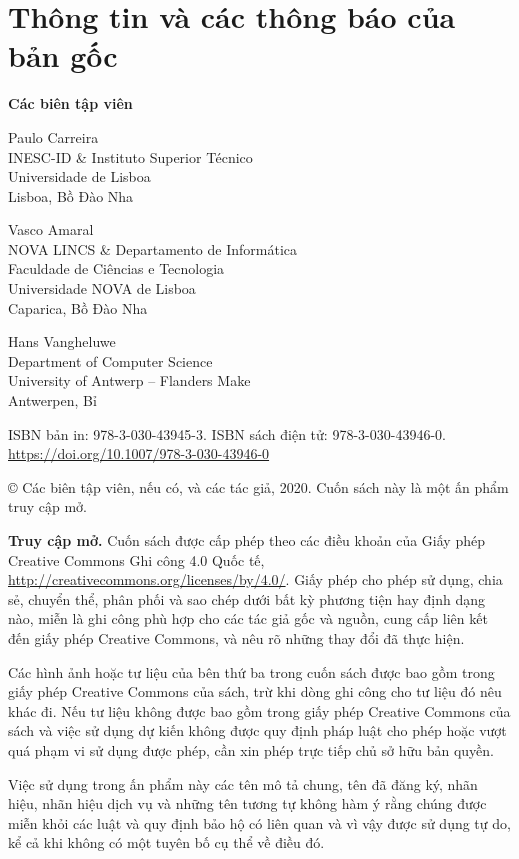 \chapter*{Thông tin và các thông báo của bản gốc}
\textbf{Các biên tập viên}

Paulo Carreira\\
INESC-ID \& Instituto Superior Técnico\\
Universidade de Lisboa\\
Lisboa, Bồ Đào Nha

Vasco Amaral\\
NOVA LINCS \& Departamento de Informática\\
Faculdade de Ciências e Tecnologia\\
Universidade NOVA de Lisboa\\
Caparica, Bồ Đào Nha

Hans Vangheluwe\\
Department of Computer Science\\
University of Antwerp -- Flanders Make\\
Antwerpen, Bỉ

ISBN bản in: 978-3-030-43945-3. ISBN sách điện tử: 978-3-030-43946-0.\\
\url{https://doi.org/10.1007/978-3-030-43946-0}

\copyright{} Các biên tập viên, nếu có, và các tác giả, 2020. Cuốn sách này là một ấn phẩm truy cập mở.

\textbf{Truy cập mở.} Cuốn sách được cấp phép theo các điều khoản của Giấy phép Creative Commons Ghi công 4.0 Quốc tế, \url{http://creativecommons.org/licenses/by/4.0/}. Giấy phép cho phép sử dụng, chia sẻ, chuyển thể, phân phối và sao chép dưới bất kỳ phương tiện hay định dạng nào, miễn là ghi công phù hợp cho các tác giả gốc và nguồn, cung cấp liên kết đến giấy phép Creative Commons, và nêu rõ những thay đổi đã thực hiện.

Các hình ảnh hoặc tư liệu của bên thứ ba trong cuốn sách được bao gồm trong giấy phép Creative Commons của sách, trừ khi dòng ghi công cho tư liệu đó nêu khác đi. Nếu tư liệu không được bao gồm trong giấy phép Creative Commons của sách và việc sử dụng dự kiến không được quy định pháp luật cho phép hoặc vượt quá phạm vi sử dụng được phép, cần xin phép trực tiếp chủ sở hữu bản quyền.

Việc sử dụng trong ấn phẩm này các tên mô tả chung, tên đã đăng ký, nhãn hiệu, nhãn hiệu dịch vụ và những tên tương tự không hàm ý rằng chúng được miễn khỏi các luật và quy định bảo hộ có liên quan và vì vậy được sử dụng tự do, kể cả khi không có một tuyên bố cụ thể về điều đó.

